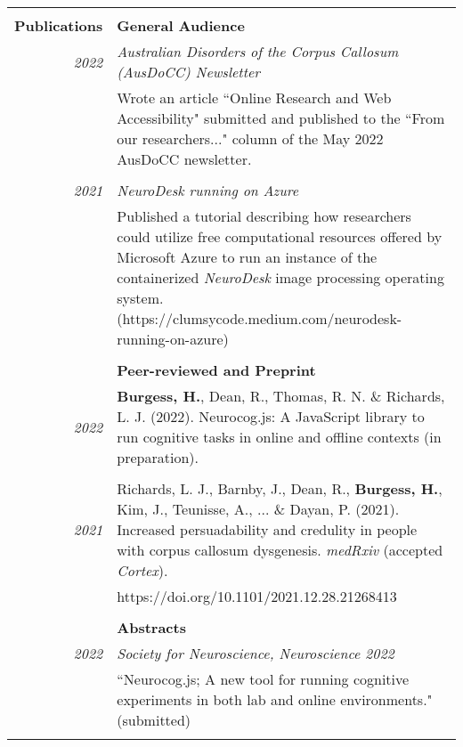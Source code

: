 \documentclass{article}
\begin{document}
\begin{longtable}{>{\columncolor{LeftColumn}}r | p{13cm}}
											\pagebreak

											\hline \\
		\large\textbf{Publications}			& \large\textbf{General Audience} \\
		\large\textit{2022}					& \large\textit{Australian Disorders of the Corpus Callosum (AusDoCC) Newsletter} \\
											& Wrote an article ``Online Research and Web Accessibility" submitted and published to the ``From our researchers..." column of the May 2022 AusDoCC newsletter. \\	
											& \\
											
		\large\textit{2021}					& \large\textit{NeuroDesk running on Azure}	\\	
											& Published a tutorial describing how researchers could utilize free computational resources offered by Microsoft Azure to run an instance of the containerized \textit{NeuroDesk} image processing operating system. (https://clumsycode.medium.com/neurodesk-running-on-azure) \\
											& \\
											
											& \large\textbf{Peer-reviewed and Preprint} \\
		\large\textit{2022}					&  \textbf{Burgess, H.}, Dean, R., Thomas, R. N. \& Richards, L. J. (2022). Neurocog.js: A JavaScript library to run cognitive tasks in online and offline contexts (in preparation). \\
											& \\

		\large\textit{2021}					& Richards, L. J., Barnby, J., Dean, R., \textbf{Burgess, H.}, Kim, J., Teunisse, A., ... \& Dayan, P. (2021). Increased persuadability and credulity in people with corpus callosum dysgenesis. \textit{medRxiv} (accepted \textit{Cortex}). \\
											& https://doi.org/10.1101/2021.12.28.21268413 \\
											& \\
											
											& \large\textbf{Abstracts} \\
		\large\textit{2022}					& \large\textit{Society for Neuroscience, Neuroscience 2022}\\
											& ``Neurocog.js; A new tool for running cognitive experiments in both lab and online environments." (submitted)  \\
											& \\


\end{longtable}
\end{document}
